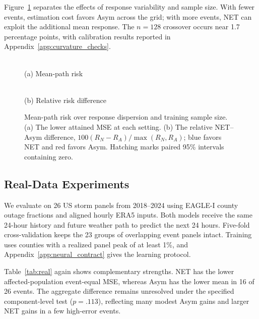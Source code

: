 Figure~\ref{fig:distribution_grid} separates the effects of response variability and sample size. With fewer events, estimation cost favors Asym across the grid; with more events, NET can exploit the additional mean response. The $n=128$ crossover occurs near 1.7 percentage points, with calibration results reported in Appendix~\ref{app:curvature_checks}.

\begin{figure}[!t]
\centering
\begin{minipage}[t]{.492\textwidth}\centering
{}\\[-2pt]
\small (a) Mean-path risk
\end{minipage}\hspace{0.004\textwidth}%
\begin{minipage}[t]{.492\textwidth}\centering
{}\\[-2pt]
\small (b) Relative risk difference
\end{minipage}
\caption{Mean-path risk over response dispersion and training sample size. (a) The lower attained MSE at each setting. (b) The relative NET--Asym difference, $100(R_N-R_A)/\max(R_N,R_A)$; blue favors NET and red favors Asym. Hatching marks paired 95\% intervals containing zero.}
\label{fig:distribution_grid}
\end{figure}

\subsection{Real-Data Experiments}
\label{sec:real}
We evaluate on 26 US storm panels from 2018--2024 using EAGLE-I county outage fractions and aligned hourly ERA5 inputs. Both models receive the same 24-hour history and future weather path to predict the next 24 hours. Five-fold cross-validation keeps the 23 groups of overlapping event panels intact. Training uses counties with a realized panel peak of at least 1\%, and Appendix~\ref{app:neural_contract} gives the learning protocol.

Table~\ref{tab:real} again shows complementary strengths. NET has the lower affected-population event-equal MSE, whereas Asym has the lower mean in 16 of 26 events. The aggregate difference remains unresolved under the specified component-level test ($p=.113$), reflecting many modest Asym gains and larger NET gains in a few high-error events.

